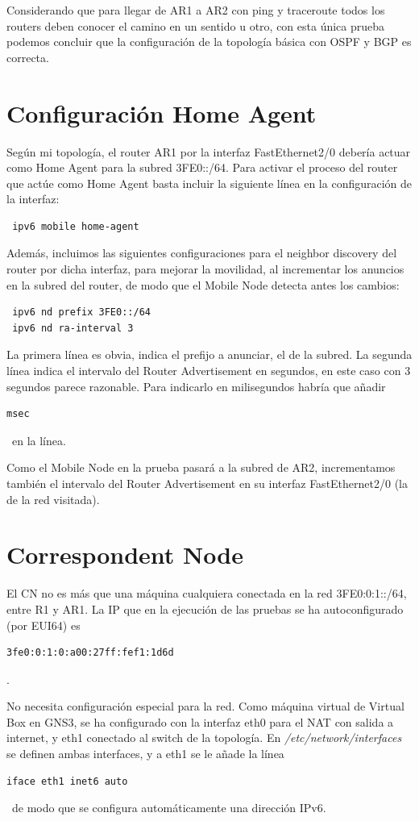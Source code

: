 \documentclass{article}
\begin{document}
Considerando que para llegar de AR1 a AR2 con ping y traceroute todos los routers deben conocer el camino en un sentido u otro, con esta única prueba podemos concluir que la configuración de la topología básica con OSPF y BGP es correcta.


\section{Configuración Home Agent}
Según mi topología, el router AR1 por la interfaz FastEthernet2/0 debería actuar como Home Agent para la subred 3FE0::/64. Para activar el proceso del router que actúe como Home Agent basta incluir la siguiente línea en la configuración de la interfaz:
\begin{BVerbatim}
 ipv6 mobile home-agent
\end{BVerbatim}

Además, incluimos las siguientes configuraciones para el neighbor discovery del router por dicha interfaz, para mejorar la movilidad, al incrementar los anuncios en la subred del router, de modo que el Mobile Node detecta antes los cambios:

\begin{BVerbatim}
 ipv6 nd prefix 3FE0::/64
 ipv6 nd ra-interval 3
\end{BVerbatim}

La primera línea es obvia, indica el prefijo a anunciar, el de la subred. La segunda línea indica el intervalo del Router Advertisement en segundos, en este caso con 3 segundos parece razonable. Para indicarlo en milisegundos habría que añadir
\begin{BVerbatim}
msec
\end{BVerbatim}
\ en la línea.

Como el Mobile Node en la prueba pasará a la subred de AR2, incrementamos también el intervalo del Router Advertisement en su interfaz FastEthernet2/0 (la de la red visitada).

\section{Correspondent Node}
El CN no es más que una máquina cualquiera conectada en la red 3FE0:0:1::/64, entre R1 y AR1. La IP que en la ejecución de las pruebas se ha autoconfigurado (por EUI64) es
\begin{BVerbatim}
3fe0:0:1:0:a00:27ff:fef1:1d6d
\end{BVerbatim}
.

No necesita configuración especial para la red. Como máquina virtual de Virtual Box en GNS3, se ha configurado con la interfaz eth0 para el NAT con salida a internet, y eth1 conectado al switch de la topología. En \textit{/etc/network/interfaces} se definen ambas interfaces, y a eth1 se le añade la línea
\begin{BVerbatim}
iface eth1 inet6 auto
\end{BVerbatim}
\ de modo que se configura automáticamente una dirección IPv6.
\end{document}

